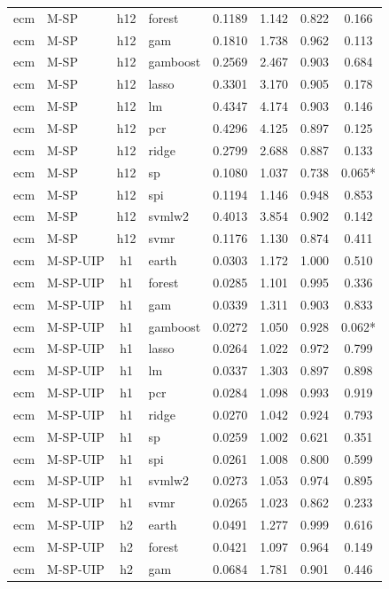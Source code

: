 \begin{ThreePartTable}
\begin{longtable}[t]{llclcccc}
ecm & M-SP & h12 & forest & 0.1189 & 1.142 & 0.822 & 0.166\\
ecm & M-SP & h12 & gam & 0.1810 & 1.738 & 0.962 & 0.113\\
ecm & M-SP & h12 & gamboost & 0.2569 & 2.467 & 0.903 & 0.684\\
ecm & M-SP & h12 & lasso & 0.3301 & 3.170 & 0.905 & 0.178\\
ecm & M-SP & h12 & lm & 0.4347 & 4.174 & 0.903 & 0.146\\
ecm & M-SP & h12 & pcr & 0.4296 & 4.125 & 0.897 & 0.125\\
ecm & M-SP & h12 & ridge & 0.2799 & 2.688 & 0.887 & 0.133\\
ecm & M-SP & h12 & sp & 0.1080 & 1.037 & 0.738 & 0.065*\\
ecm & M-SP & h12 & spi & 0.1194 & 1.146 & 0.948 & 0.853\\
ecm & M-SP & h12 & svmlw2 & 0.4013 & 3.854 & 0.902 & 0.142\\
ecm & M-SP & h12 & svmr & 0.1176 & 1.130 & 0.874 & 0.411\\
\addlinespace
ecm & M-SP-UIP & h1 & earth & 0.0303 & 1.172 & 1.000 & 0.510\\
ecm & M-SP-UIP & h1 & forest & 0.0285 & 1.101 & 0.995 & 0.336\\
ecm & M-SP-UIP & h1 & gam & 0.0339 & 1.311 & 0.903 & 0.833\\
ecm & M-SP-UIP & h1 & gamboost & 0.0272 & 1.050 & 0.928 & 0.062*\\
ecm & M-SP-UIP & h1 & lasso & 0.0264 & 1.022 & 0.972 & 0.799\\
ecm & M-SP-UIP & h1 & lm & 0.0337 & 1.303 & 0.897 & 0.898\\
ecm & M-SP-UIP & h1 & pcr & 0.0284 & 1.098 & 0.993 & 0.919\\
ecm & M-SP-UIP & h1 & ridge & 0.0270 & 1.042 & 0.924 & 0.793\\
ecm & M-SP-UIP & h1 & sp & 0.0259 & 1.002 & 0.621 & 0.351\\
ecm & M-SP-UIP & h1 & spi & 0.0261 & 1.008 & 0.800 & 0.599\\
ecm & M-SP-UIP & h1 & svmlw2 & 0.0273 & 1.053 & 0.974 & 0.895\\
ecm & M-SP-UIP & h1 & svmr & 0.0265 & 1.023 & 0.862 & 0.233\\
\addlinespace
ecm & M-SP-UIP & h2 & earth & 0.0491 & 1.277 & 0.999 & 0.616\\
ecm & M-SP-UIP & h2 & forest & 0.0421 & 1.097 & 0.964 & 0.149\\
ecm & M-SP-UIP & h2 & gam & 0.0684 & 1.781 & 0.901 & 0.446\\

\end{longtable}
\end{ThreePartTable}
